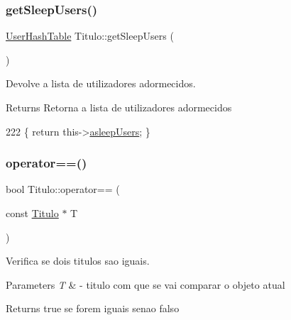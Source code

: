 \subsubsection{\texorpdfstring{get\+Sleep\+Users()}{getSleepUsers()}}
{\footnotesize\ttfamily \hyperlink{Titulo_8h_a0996281e9e5d419736dec228200cfdc5}{User\+Hash\+Table} Titulo\+::get\+Sleep\+Users (\begin{DoxyParamCaption}{ }\end{DoxyParamCaption})\hspace{0.3cm}{\ttfamily [inline]}}



Devolve a lista de utilizadores adormecidos. 

\begin{DoxyReturn}{Returns}
Retorna a lista de utilizadores adormecidos 
\end{DoxyReturn}

\begin{DoxyCode}
222 \{ \textcolor{keywordflow}{return} this->\hyperlink{classTitulo_a84e7b9dc58fbba5f048a57a0878a43e8}{asleepUsers}; \}
\end{DoxyCode}
\mbox{\label{classTitulo_ac0622a3b256910ac87ee900a9be014b6}} 
\subsubsection{\texorpdfstring{operator==()}{operator==()}}
{\footnotesize\ttfamily bool Titulo\+::operator== (\begin{DoxyParamCaption}\item[{const \hyperlink{classTitulo}{Titulo} $\ast$}]{T }\end{DoxyParamCaption})}



Verifica se dois titulos sao iguais. 


\begin{DoxyParams}{Parameters}
{\em T} & -\/ titulo com que se vai comparar o objeto atual \\
\hline
\end{DoxyParams}
\begin{DoxyReturn}{Returns}
true se forem iguais senao falso 
\end{DoxyReturn}

